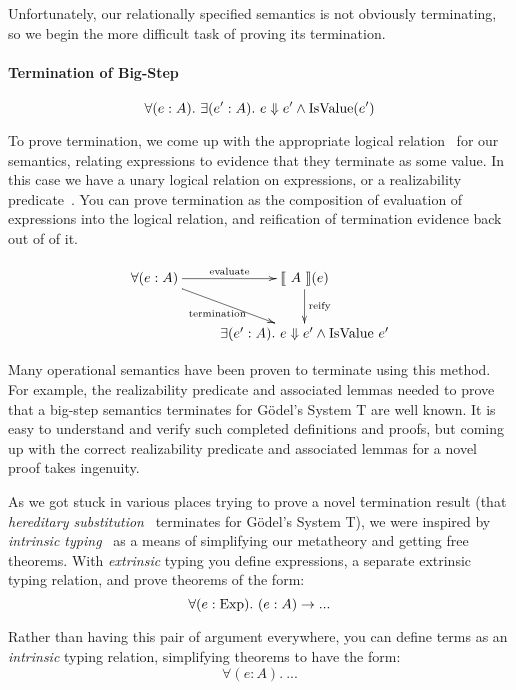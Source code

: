 \documentclass[preprint,nonatbib]{sigplanconf}
\numberwithin{mysubdfn}{mydfn}
\def\bigstep{\Downarrow}
\def\marr{\rightarrow}
\newcommand{\ascribe}[2]{(#1 : #2)}
\newcommand{\all}[1]{\forall#1.~}
\newcommand{\ex}[1]{\exists#1.~}
\newcommand{\el}[1]{\llbracket ~ #1 ~ \rrbracket}
\newcommand{\con}[1]{\textmd{#1}}
\newcommand{\fun}[1]{\textmd{#1}}
\begin{document}
Unfortunately, our relationally specified semantics is not obviously
terminating, so we begin the more difficult task of proving its
termination.

\paragraph{Termination of Big-Step}

$$
\all{\ascribe{e}{A}} \ex{\ascribe{e'}{A}} e \bigstep e' \land \fun{IsValue}(e')
$$

To prove termination, we come up with the appropriate logical
relation~\cite{TODO} for our semantics, relating expressions to evidence
that they terminate as some value.
In this case we have a unary
logical relation on expressions, or a realizability
predicate~\cite{TODO}. You can prove termination as the composition of
evaluation of expressions into the logical relation, and reification
of termination evidence back out of of it.

\begin{displaymath}
    \xymatrix{
          {\forall (e : A)} 
          \ar[dr]_{\fun{termination}}
          \ar[r]^{\fun{evaluate}}
        & {\el{A}(e)}
          \ar[d]^{\large{\fun{reify}}}
\\      & {\exists (e' : A). ~ e \bigstep e' \wedge \fun{IsValue} ~ e'} }
\end{displaymath}

Many operational semantics have been proven to terminate using this
method. For example, the realizability predicate and associated lemmas
needed to prove that a big-step semantics terminates for G{\"o}del's
System T are well known. It is easy to understand and verify such
completed definitions and proofs, but coming up with the correct
realizability predicate and associated lemmas for a novel proof takes
ingenuity. 

As we got stuck in various places trying to prove a novel termination result
(that {\it hereditary substitution}~\cite{TODO} terminates for
G{\"o}del's System T), we were inspired by
{\it intrinsic typing}~\cite{TODO} as a means of simplifying our
metatheory and getting free theorems. With {\it extrinsic} typing you
define expressions, a separate extrinsic typing relation, and prove
theorems of the form:
$$
\all{\ascribe{e}{\con{Exp}}} \ascribe{e}{A} \marr ...
$$

Rather than having this pair of argument everywhere, you can define
terms as an {\it intrinsic} typing relation, simplifying theorems to
have the form:
$$
\all{\ascribe{e}{A}} ...
$$
\end{document}
